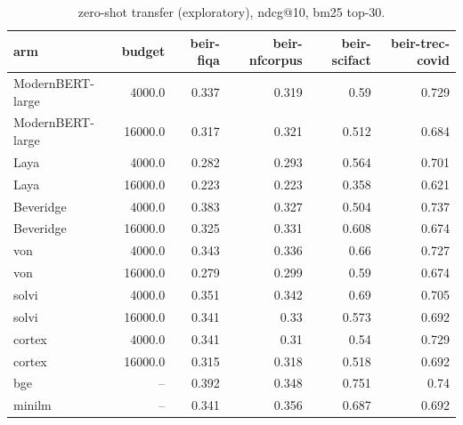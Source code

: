 \begin{table}[t]
\centering
\caption{zero-shot transfer (exploratory), ndcg@10, bm25 top-30.}
\begin{tabular}{l r r r r r}
\toprule
arm & budget & beir-fiqa & beir-nfcorpus & beir-scifact & beir-trec-covid \\
\midrule
ModernBERT-large & 4000.0 & 0.337 & 0.319 & 0.59 & 0.729 \\
ModernBERT-large & 16000.0 & 0.317 & 0.321 & 0.512 & 0.684 \\
Laya & 4000.0 & 0.282 & 0.293 & 0.564 & 0.701 \\
Laya & 16000.0 & 0.223 & 0.223 & 0.358 & 0.621 \\
Beveridge & 4000.0 & 0.383 & 0.327 & 0.504 & 0.737 \\
Beveridge & 16000.0 & 0.325 & 0.331 & 0.608 & 0.674 \\
von & 4000.0 & 0.343 & 0.336 & 0.66 & 0.727 \\
von & 16000.0 & 0.279 & 0.299 & 0.59 & 0.674 \\
solvi & 4000.0 & 0.351 & 0.342 & 0.69 & 0.705 \\
solvi & 16000.0 & 0.341 & 0.33 & 0.573 & 0.692 \\
cortex & 4000.0 & 0.341 & 0.31 & 0.54 & 0.729 \\
cortex & 16000.0 & 0.315 & 0.318 & 0.518 & 0.692 \\
bge & – & 0.392 & 0.348 & 0.751 & 0.74 \\
minilm & – & 0.341 & 0.356 & 0.687 & 0.692 \\
\bottomrule
\end{tabular}
\end{table}
